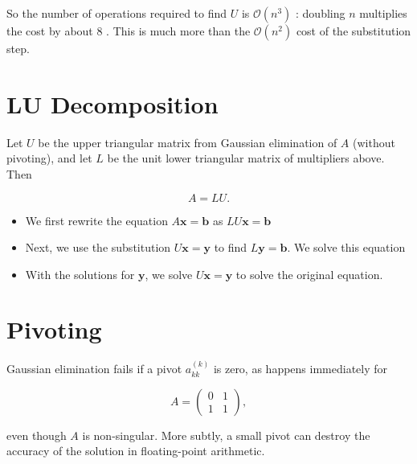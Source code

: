 \begin{remark}
So the number of operations required to find \(U\) is \(\mathcal{O}\left(n^3\right)\) : doubling \(n\) multiplies the cost by about 8 . This is much more than the \(\mathcal{O}\left(n^2\right)\) cost of the substitution step.
\end{remark}

\section{LU Decomposition}

\begin{theorem}[LU Decomposition]
  Let \(U\) be the upper triangular matrix from Gaussian elimination of \(A\) (without pivoting), and let \(L\) be the unit lower triangular matrix of multipliers above. Then

\[
A=L U .
\]
\end{theorem}

\begin{method}
  \begin{itemize}
    \item[1.] We first rewrite the equation \(A\mathbf{x} = \mathbf{b}\) as \(LU\mathbf{x} = \mathbf{b}\)
    \item[2.] Next, we use the substitution \(U\mathbf{x} = \mathbf{y}\) to find \(L\mathbf{y} = \mathbf{b}\). We solve this equation
    \item[3.] With the solutions for \(\mathbf{y}\), we solve \(U\mathbf{x} = \mathbf{y}\) to solve the original equation.
  \end{itemize}
\end{method}

\section{Pivoting}

\begin{remark}
  Gaussian elimination fails if a pivot \(a_{k k}^{(k)}\) is zero, as happens immediately for

\[
A=\left(\begin{array}{ll}
0 & 1 \\
1 & 1
\end{array}\right),
\]

even though \(A\) is non-singular. More subtly, a small pivot can destroy the accuracy of the solution in floating-point arithmetic.
\end{remark}

